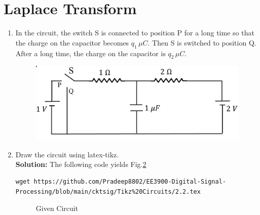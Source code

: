 \documentclass[journal,12pt,twocolumn]{IEEEtran}
\newcommand{\solution}{\noindent \textbf{Solution: }}
\numberwithin{equation}{section}
\renewcommand\thesection{\arabic{section}}
\begin{document}
 \section{Laplace Transform}
\begin{enumerate}[label=\arabic*.,ref=\thesection.\theenumi]
\item In the circuit, the switch S is connected to position P for a long time so that the charge on the capacitor
	becomes $q_1 \, \mu C$. Then S is switched to position Q.  After a long time, the charge on the capacitor is
		$q_2 \, \mu C$.
		\begin{figure}[!ht]
			\centering
			\includegraphics[width=\columnwidth]{figs/ckt.jpg}
			\caption{}
			\label{fig:ckt}
\end{figure}
\item Draw the circuit using latex-tikz.\\
\solution The following code yields Fig.\ref{fig:qn}
\begin{lstlisting}
wget https://github.com/Pradeep8802/EE3900-Digital-Signal-Processing/blob/main/cktsig/Tikz%20Circuits/2.2.tex
\end{lstlisting}
\begin{figure}[!ht]
 \centering
  
\caption{Given Circuit}
\label{fig:qn}
\end{figure}


\end{enumerate}
\end{document}
